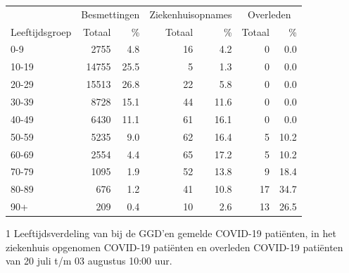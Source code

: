 \documentclass[
  english,
  man,floatsintext]{apa6}
\begin{document}
\begin{table}
\centering\begingroup\fontsize{11}{13}\selectfont

\begin{threeparttable}
\begin{tabular}{lrrrrrr}
\toprule
\multicolumn{1}{c}{ } & \multicolumn{2}{c}{Besmettingen} & \multicolumn{2}{c}{Ziekenhuisopnames} & \multicolumn{2}{c}{Overleden} \\
\cmidrule(l{3pt}r{3pt}){2-3} \cmidrule(l{3pt}r{3pt}){4-5} \cmidrule(l{3pt}r{3pt}){6-7}
Leeftijdsgroep & Totaal & \% & Totaal & \% & Totaal & \%\\
\midrule
0-9 & 2755 & 4.8 & 16 & 4.2 & 0 & 0.0\\
10-19 & 14755 & 25.5 & 5 & 1.3 & 0 & 0.0\\
20-29 & 15513 & 26.8 & 22 & 5.8 & 0 & 0.0\\
30-39 & 8728 & 15.1 & 44 & 11.6 & 0 & 0.0\\
40-49 & 6430 & 11.1 & 61 & 16.1 & 0 & 0.0\\
50-59 & 5235 & 9.0 & 62 & 16.4 & 5 & 10.2\\
60-69 & 2554 & 4.4 & 65 & 17.2 & 5 & 10.2\\
70-79 & 1095 & 1.9 & 52 & 13.8 & 9 & 18.4\\
80-89 & 676 & 1.2 & 41 & 10.8 & 17 & 34.7\\
90+ & 209 & 0.4 & 10 & 2.6 & 13 & 26.5\\
\bottomrule
\end{tabular}
\begin{tablenotes}
\item[1] Leeftijdsverdeling van bij de GGD’en gemelde COVID-19 patiënten, in het ziekenhuis opgenomen COVID-19 patiënten en overleden COVID-19 patiënten van 20 juli t/m 03 augustus 10:00 uur.
\end{tablenotes}
\end{threeparttable}
\endgroup{}
\end{table}

\newpage
\end{document}
